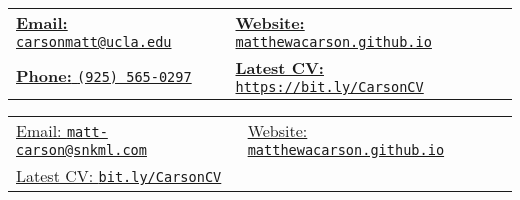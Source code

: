 \documentclass[12pt]{resume} %
\begin{document}
\thispagestyle{firstpagestyle}
\raggedright
\renewcommand{\labelitemi}{\scriptsize$\bullet$}
{}
{\begin{table}[h]
    \centering
    \begin{tabular*}{\textwidth}{@{\extracolsep{\fill}}ll}
        \href{mailto:carsonmatt@ucla.edu}{\textbf{Email:} \texttt{carsonmatt@ucla.edu}}& \href{http://matthewacarson.github.io}{\textbf{Website:} \texttt{matthewacarson.github.io}} \\
        \href{tel:9255650297}{\textbf{Phone:} \texttt{(925) 565-0297}}& \href{https://bit.ly/CarsonCV}{\textbf{Latest CV:} \texttt{https://bit.ly/CarsonCV}} \\
    \end{tabular*}
\end{table}}
  {\begin{table}[h]
    \centering
    \begin{tabular*}{\textwidth}{@{\extracolsep{\fill}}ll}
        \href{mailto:matt-carson@snkml.com}{Email: \texttt{matt-carson@snkml.com}}& \href{http://matthewacarson.github.io}{Website: \texttt{matthewacarson.github.io}} \\
        \href{https://bit.ly/CarsonCV}{Latest CV: \texttt{bit.ly/CarsonCV}}& \\
    \end{tabular*}
\end{table}}
\vspace{-10pt}
\end{document}

